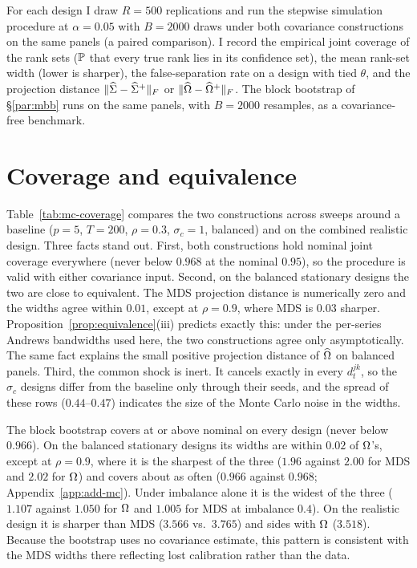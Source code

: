 For each design I draw $R=500$ replications and run the stepwise simulation procedure at
$\alpha=0.05$ with $B=2000$ draws under both covariance constructions on the same panels
(a paired comparison). I record the empirical joint coverage
of the rank sets ($\mathbb{P}$ that every true rank lies in its confidence set), the mean
rank-set width (lower is sharper), the false-separation rate on a design with tied
$\theta$, and the projection distance $\lVert \widehat{\Sigma}-\widehat{\Sigma}^{+} \rVert_{F}$ or
$\lVert \widehat{\Omega}-\widehat{\Omega}^{+} \rVert_{F}$. The block bootstrap of \S\ref{par:mbb} runs on the
same panels, with $B=2000$ resamples, as a covariance-free benchmark.

\section{Coverage and equivalence}
\label{sec:mc-coverage}

Table~\ref{tab:mc-coverage} compares the two constructions across sweeps around a
baseline ($p=5$, $T=200$, $\rho=0.3$, $\sigma_c=1$, balanced) and on the combined
realistic design. Three facts stand out. First, both constructions hold nominal joint
coverage everywhere (never below $0.968$ at the nominal $0.95$), so the procedure is
valid with either covariance input. Second, on the balanced stationary designs the two
are close to equivalent. The MDS projection distance is numerically zero and the widths
agree within $0.01$, except at $\rho=0.9$, where MDS is $0.03$ sharper.
Proposition~\ref{prop:equivalence}(iii) predicts exactly this: under the per-series
Andrews bandwidths used here, the two constructions agree only asymptotically. The same
fact explains the small positive projection distance of $\widehat{\Omega}$ on balanced panels.
Third, the common shock is inert. It cancels exactly in every $d^{jk}_t$, so the
$\sigma_c$ designs differ from the baseline only through their seeds, and the spread of
these rows ($0.44$--$0.47$) indicates the size of the Monte Carlo noise in the widths.

The block bootstrap covers at or above nominal on every
design (never below $0.966$). On the balanced stationary designs its widths are within
$0.02$ of $\Omega$'s, except at $\rho=0.9$, where it is the sharpest of the three
($1.96$ against $2.00$ for MDS and $2.02$ for $\Omega$) and covers about as often
($0.966$ against $0.968$; Appendix~\ref{app:add-mc}). Under imbalance alone it is the
widest of the three ($1.107$ against $1.050$ for $\Omega$ and $1.005$ for MDS at
imbalance $0.4$). On the realistic design it is sharper than MDS ($3.566$ vs.\ $3.765$)
and sides with $\Omega$ ($3.518$). Because the bootstrap uses no covariance
estimate, this pattern is consistent with the MDS widths there reflecting lost
calibration rather than the data.

